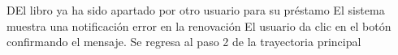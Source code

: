 				\begin{UCtrayectoriaA}{D}{El libro ya ha sido apartado por otro usuario para su préstamo }
			\UCpaso[\UCsist]El sistema muestra una notificación error en la renovación  
			\UCpaso[\UCactor] El usuario da clic en el botón  confirmando el mensaje. 
			\UCpaso[\UCsist] Se regresa al paso 2 de la trayectoria principal 
		\end{UCtrayectoriaA}

